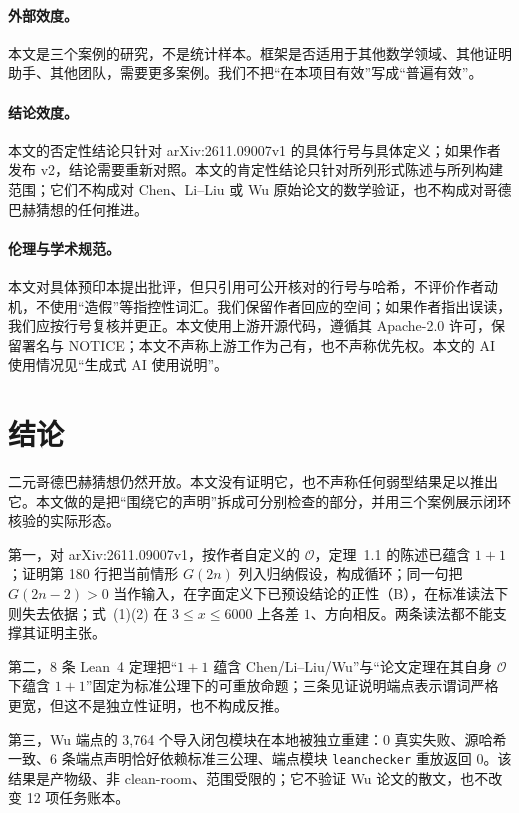 \documentclass[11pt,a4paper]{ctexart}
\theoremstyle{plain}
\theoremstyle{definition}
\begin{document}
\paragraph{外部效度。}
本文是三个案例的研究，不是统计样本。框架是否适用于其他数学领域、其他证明助手、其他团队，需要更多案例。我们不把“在本项目有效”写成“普遍有效”。

\paragraph{结论效度。}
本文的否定性结论只针对 arXiv:2611.09007v1 的具体行号与具体定义；如果作者发布 v2，结论需要重新对照。本文的肯定性结论只针对所列形式陈述与所列构建范围；它们不构成对 Chen、Li--Liu 或 Wu 原始论文的数学验证，也不构成对哥德巴赫猜想的任何推进。

\paragraph{伦理与学术规范。}
本文对具体预印本提出批评，但只引用可公开核对的行号与哈希，不评价作者动机，不使用“造假”等指控性词汇。我们保留作者回应的空间；如果作者指出误读，我们应按行号复核并更正。本文使用上游开源代码，遵循其 Apache-2.0 许可，保留署名与 NOTICE；本文不声称上游工作为己有，也不声称优先权。本文的 AI 使用情况见“生成式 AI 使用说明”。

\section{结论}
\label{sec:conclusion}

二元哥德巴赫猜想仍然开放。本文没有证明它，也不声称任何弱型结果足以推出它。本文做的是把“围绕它的声明”拆成可分别检查的部分，并用三个案例展示闭环核验的实际形态。

第一，对 arXiv:2611.09007v1，按作者自定义的 $\mathcal O$，定理~1.1 的陈述已蕴含 $1+1$；证明第 180 行把当前情形 $G(2n)$ 列入归纳假设，构成循环；同一句把 $G(2n-2)>0$ 当作输入，在字面定义下已预设结论的正性（B），在标准读法下则失去依据；式~(1)(2) 在 $3\le x\le6000$ 上各差 $1$、方向相反。两条读法都不能支撑其证明主张。

第二，8 条 Lean~4 定理把“$1+1$ 蕴含 Chen/Li--Liu/Wu”与“论文定理在其自身 $\mathcal O$ 下蕴含 $1+1$”固定为标准公理下的可重放命题；三条见证说明端点表示谓词严格更宽，但这不是独立性证明，也不构成反推。

第三，Wu 端点的 3,764 个导入闭包模块在本地被独立重建：0 真实失败、源哈希一致、6 条端点声明恰好依赖标准三公理、端点模块 \texttt{leanchecker} 重放返回 0。该结果是产物级、非 clean-room、范围受限的；它不验证 Wu 论文的散文，也不改变 12 项任务账本。
\end{document}

